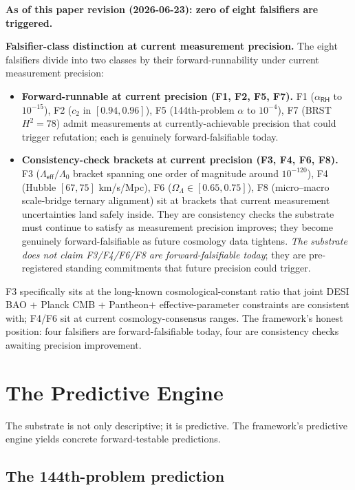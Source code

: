 \documentclass[11pt,a4paper]{amsart}
\theoremstyle{plain}
\theoremstyle{definition}
\begin{document}
\textbf{As of this paper revision (2026-06-23): zero of eight falsifiers are triggered.}

\textbf{Falsifier-class distinction at current measurement precision.} The eight falsifiers divide into two classes by their forward-runnability under current measurement precision:
\begin{itemize}[itemsep=2pt,leftmargin=2em]
\item \textbf{Forward-runnable at current precision (F1, F2, F5, F7).} F1 ($\alpha_{\textsf{RH}}$ to $10^{-15}$), F2 ($c_2$ in $[0.94, 0.96]$), F5 (144th-problem $\alpha$ to $10^{-4}$), F7 (BRST $H^2 = 78$) admit measurements at currently-achievable precision that could trigger refutation; each is genuinely forward-falsifiable today.
\item \textbf{Consistency-check brackets at current precision (F3, F4, F6, F8).} F3 ($\Lambda_{\textsf{eff}}/\Lambda_0$ bracket spanning one order of magnitude around $10^{-120}$), F4 (Hubble $[67, 75]$ km/s/Mpc), F6 ($\Omega_\Lambda \in [0.65, 0.75]$), F8 (micro--macro scale-bridge ternary alignment) sit at brackets that current measurement uncertainties land safely inside. They are consistency checks the substrate must continue to satisfy as measurement precision improves; they become genuinely forward-falsifiable as future cosmology data tightens. \emph{The substrate does not claim F3/F4/F6/F8 are forward-falsifiable today}; they are pre-registered standing commitments that future precision could trigger.
\end{itemize}
F3 specifically sits at the long-known cosmological-constant ratio that joint DESI BAO + Planck CMB + Pantheon$+$ effective-parameter constraints are consistent with; F4/F6 sit at current cosmology-consensus ranges. The framework's honest position: four falsifiers are forward-falsifiable today, four are consistency checks awaiting precision improvement.

\section{The Predictive Engine}\label{sec:predictive}

The substrate is not only descriptive; it is predictive. The framework's predictive engine yields concrete forward-testable predictions.

\subsection{The 144th-problem prediction}
\end{document}
